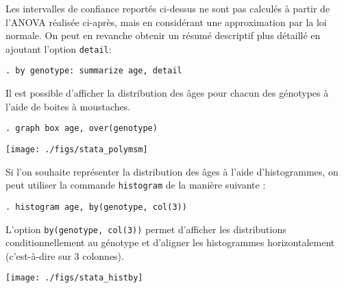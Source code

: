 Les intervalles de confiance reportés ci-dessus ne sont pas calculés à
partir de l'ANOVA réalisée ci-après, mais en considérant une approximation par
la loi normale. On peut en revanche obtenir un résumé descriptif plus
détaillé en ajoutant l'option \texttt{detail}: 
\begin{verbatim}
. by genotype: summarize age, detail
\end{verbatim}

Il est possible d'afficher la distribution des âges pour chacun des
génotypes à l'aide de boites à moustaches.
\begin{verbatim}
. graph box age, over(genotype)
\end{verbatim}

\texttt{[image: ./figs/stata\_polymsm]}

Si l'on souhaite représenter la distribution des âges à l'aide
d'histogrammes, on peut utiliser la commande \texttt{histogram} de la
manière suivante :
\begin{verbatim}
. histogram age, by(genotype, col(3))
\end{verbatim}
L'option \verb|by(genotype, col(3))| permet d'afficher les distributions
conditionnellement au génotype et d'aligner les histogrammes horizontalement
(c'est-à-dire sur 3 colonnes).

\texttt{[image: ./figs/stata\_histby]}

